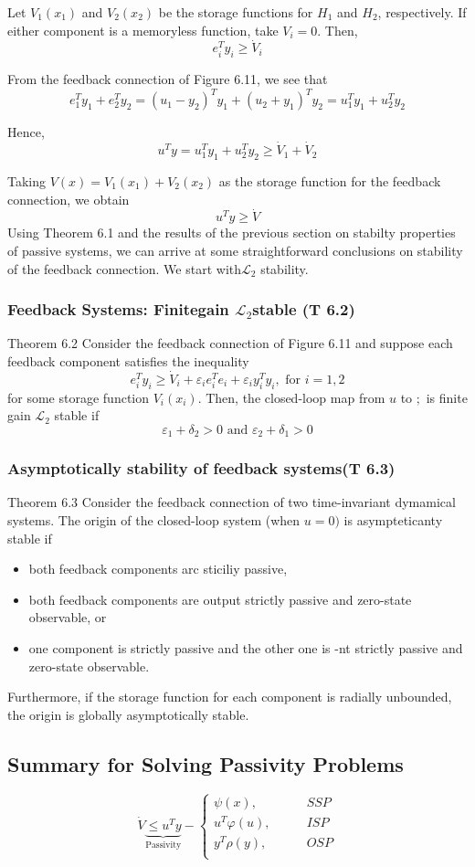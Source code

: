 \documentclass{article}
\begin{document}
\begin{frm-prf}
	Let $V_1\left(x_1\right)$ and $V_2\left(x_2\right)$ be the storage functions for $H_1$ and $H_2$, respectively. If either component is a memoryless function, take $V_i=0$. Then,
$$
e_i^T y_i \geq \dot{V}_i
$$

From the feedback connection of Figure 6.11, we see that
$$
e_1^T y_1+e_2^T y_2=\left(u_1-y_2\right)^T y_1+\left(u_2+y_1\right)^T y_2=u_1^T y_1+u_2^T y_2
$$

Hence,
$$
u^T y=u_1^T y_1+u_2^T y_2 \geq \dot{V}_1+\dot{V}_2
$$

Taking $V(x)=V_1\left(x_1\right)+V_2\left(x_2\right)$ as the storage function for the feedback connection, we obtain
$$
u^T y \geq \dot{V}
$$
Using Theorem 6.1 and the results of the previous section on stabilty properties of passive systems, we can arrive at some straightforward conclusions on stability of the feedback connection. We start with$\mathcal{L}_2$ stability.
\end{frm-prf}
\subsubsection{Feedback Systems: Finitegain $\mathcal{L}_2$stable (T 6.2)}
Theorem 6.2 Consider the feedback connection of Figure 6.11 and suppose each feedback component satisfies the inequality
$$
e_i^T y_i \geq \dot{V}_i+\varepsilon_i e_i^T e_i+\varepsilon_i y_i^T y_i, \text { for } i=1,2
$$
for some storage function $V_i\left(x_i\right)$. Then, the closed-loop map from $u$ to $;$ is finite gain $\mathcal{L}_2$ stable if
$$
\varepsilon_1+\delta_2>0 \text { and } \varepsilon_2+\delta_1>0
$$
\subsubsection{Asymptotically stability of feedback systems(T 6.3)}
Theorem 6.3 Consider the feedback connection of two time-invariant dymamical systems. The origin of the closed-loop system (when $u=0)$ is asympteticanty stable if
\begin{itemize}
	\item both feedback components arc sticiliy passive,
	\item both feedback components are output strictly passive and zero-state observable, or
	\item one component is strictly passive and the other one is -nt strictly passive and zero-state observable.
\end{itemize}
Furthermore, if the storage function for each component is radially unbounded, the origin is globally asymptotically stable.
\subsection{Summary for Solving Passivity Problems}
\begin{equation}
	\dot{V} \underbrace{\leq u^{T}y}_\text{Passivity} - \begin{cases}
		\psi (x), \qquad &SSP \\
		u^{T}\varphi(u), \qquad &ISP \\
		y^{T}\rho(y), \qquad &OSP \\

	\end{cases}
\end{equation}
\end{document}
